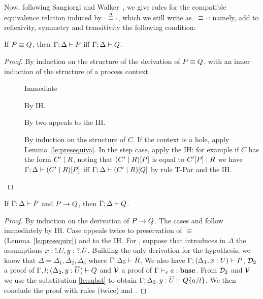 Now, following Sangiorgi and Walker~\cite{picalcbook}, we give rules for the compatible
equivalence relation induced by $\sconga\cdot\cdot$, which we still
write as $\scong\cdot\cdot$: namely, add to reflexivity, symmetry and
transitivity the following condition:
 \begin{mathpar}
 \end{mathpar}

\begin{lemma}
  \label{le:presequiv}
    If \( \scong{P}{Q} \), then \( \types{\Gamma;\Delta}{P} \)  iff \( \types{\Gamma;\Delta}{Q} \).
\end{lemma}
\begin{proof}
  By induction on the structure of the derivation of \( \scong{P}{Q} \), with an inner induction of the structure of a process context.
  \begin{description}
  \item[] Immediate
      \item[] By IH.
      \item[]  By two appeals to the IH.
      \item[] By induction on the structure of $C$. If
        the context is a hole, apply Lemma~\ref{le:presequiva}. In the
        step case, apply the IH: for example if $C$ has the form
        ${\Ppar {C'} R}$, noting that ${\PBpar{ C'} R}[P]$ is equal to
        ${\Ppar {C'[P]} R}$ we have
        \( \types{\Gamma;\Delta}{{\PBpar {C'} R}[P]} \) iff
        \( \types{\Gamma;\Delta}{{\PBpar {C'} R}[Q]} \) by rule T-Par and
        the IH.
  \end{description}
\end{proof}

\begin{theorem}
  If \( \types{\Gamma;\Delta}{P} \) and \( \reduces{P}{Q} \), then \( \types{\Gamma;\Delta}{Q} \).
\end{theorem}
\begin{proof}
  By induction on the derivation of $\reduces{P}{Q}$. The cases  and  follow immediately by IH. Case  appeals twice to
  preservation of $\equiv$ (Lemma~\ref{le:presequiv}) and to the
  IH. For , suppose that  introduces in $\Delta$ the
  assumptions $\Cadd{\hastype{x}{\Tout{U}}}{\hastype{y}{\Tin{\dual{U}}}}$.  Building the only derivation for the
  hypothesis, we know that $\Delta = \Delta_1, \Delta_2, \Delta_3$
  where $\types{\Gamma;\Delta_3}{R}$. We also have
  $\types{\Gamma;(\Cadd{\Delta_1}{\hastype{x}{U}})}{P}$, ${\cal D}_{2} $ a proof of
  $\types{\Gamma,l;(\Cadd{\Delta_2}{\hastype{y}{\dual{U}}})}{Q}$ and $\cal V $ a proof of
  $\typev{\Gamma}{\hastype{a}{\Tbase}}$.  From ${\cal D}_{2}$ and $\cal V$ we use the
  substitution \cref{le:subst} to obtain $\types{\Gamma;\Cadd{\Delta_2}{\hastype{y}{\dual{U}}}}{\subst{Q}{a}{l}}$. We then conclude the proof with rules  (twice) and .
\end{proof}

